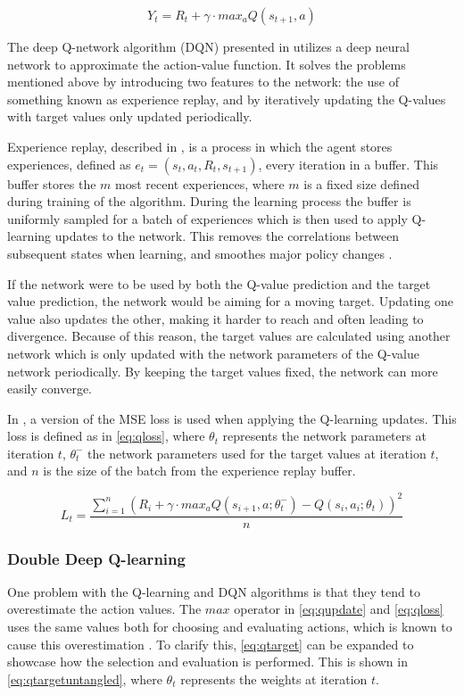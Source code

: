 \documentclass{kththesis}
\begin{document}
\begin{equation}
\label{eq:qtarget}
Y_t = R_t + \gamma \cdot max_a Q(s_{t+1}, a)
\end{equation}

The deep Q-network algorithm (DQN) presented in \textcite{mnih2015human} utilizes a deep neural network to approximate the action-value function. It solves the problems mentioned above by introducing two features to the network: the use of something known as experience replay, and by iteratively updating the Q-values with target values only updated periodically. 

Experience replay, described in \textcite{lin1992self}, is a process in which the agent stores experiences, defined as $e_t = (s_t, a_t, R_t, s_{t+1})$, every iteration in a buffer. This buffer stores the $m$ most recent experiences, where $m$ is a fixed size defined during training of the algorithm. During the learning process the buffer is uniformly sampled for a batch of experiences which is then used to apply Q-learning updates to the network. This removes the correlations between subsequent states when learning, and smoothes major policy changes \parencite{mnih2015human}.

If the network were to be used by both the Q-value prediction and the target value prediction, the network would be aiming for a moving target. Updating one value also updates the other, making it harder to reach and often leading to divergence. Because of this reason, the target values are calculated using another network which is only updated with the network parameters of the Q-value network periodically. By keeping the target values fixed, the network can more easily converge. \parencite{mnih2015human}

In \textcite{mnih2015human}, a version of the MSE loss is used when applying the Q-learning updates. This loss is defined as in \autoref{eq:qloss}, where $\theta_t$ represents the network parameters at iteration $t$, $\theta_t^-$ the network parameters used for the target values at iteration $t$, and $n$ is the size of the batch from the experience replay buffer.

\begin{equation}
\label{eq:qloss}
L_t = \frac{\sum_{i=1}^n (R_i + \gamma \cdot max_a Q(s_{i+1}, a;\theta_t^-) - Q(s_i, a_i;\theta_t))^2}{n}
\end{equation}

\subsubsection{Double Deep Q-learning}
One problem with the Q-learning and DQN algorithms is that they tend to overestimate the action values. The $max$ operator in \autoref{eq:qupdate} and \autoref{eq:qloss} uses the same values both for choosing and evaluating actions, which is known to cause this overestimation \parencite{van2016deep}. To clarify this, \autoref{eq:qtarget} can be expanded to showcase how the selection and evaluation is performed. This is shown in \autoref{eq:qtargetuntangled}, where $\theta_t$ represents the weights at iteration $t$.
\end{document}
